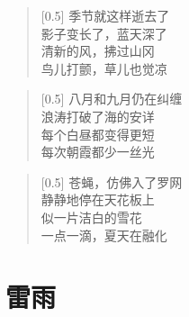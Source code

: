 \documentclass[12pt,UTF-8,openany]{ctexbook}
\begin{document}
\begin{large}
    
    \begin{verse}[0.5\linewidth]
        季节就这样逝去了 \\
        影子变长了，蓝天深了 \\
        清新的风，拂过山冈 \\
        鸟儿打颤，草儿也觉凉
    \end{verse}
    
    
    \begin{verse}[0.5\linewidth]
        八月和九月仍在纠缠 \\
        浪涛打破了海的安详 \\
        每个白昼都变得更短 \\
        每次朝霞都少一丝光
    \end{verse}
    
    
    \begin{verse}[0.5\linewidth]
        苍蝇，仿佛入了罗网 \\
        静静地停在天花板上 \\
        似一片洁白的雪花 \\
        一点一滴，夏天在融化
    \end{verse}
    
\end{large}



\chapter{雷雨}
\end{document}
